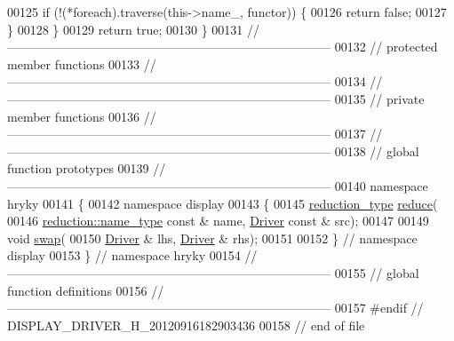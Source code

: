\begin{DoxyCode}
00125         \textcolor{keywordflow}{if} (!(*foreach).traverse(this->name\_, functor)) \{
00126             \textcolor{keywordflow}{return} \textcolor{keyword}{false};
00127         \}
00128     \}
00129     \textcolor{keywordflow}{return} \textcolor{keyword}{true};
00130 \}
00131 \textcolor{comment}{//
      ------------------------------------------------------------------------------}
00132 \textcolor{comment}{// protected member functions}
00133 \textcolor{comment}{//
      ------------------------------------------------------------------------------}
00134 \textcolor{comment}{//
      ------------------------------------------------------------------------------}
00135 \textcolor{comment}{// private member functions}
00136 \textcolor{comment}{//
      ------------------------------------------------------------------------------}
00137 \textcolor{comment}{//
      ------------------------------------------------------------------------------}
00138 \textcolor{comment}{// global function prototypes}
00139 \textcolor{comment}{//
      ------------------------------------------------------------------------------}
00140 \textcolor{keyword}{namespace }hryky
00141 \{
00142 \textcolor{keyword}{namespace }display
00143 \{
00145     \hyperlink{classhryky_1_1_intrusive_ptr}{reduction_type} \hyperlink{namespacehryky_1_1display_a705ac3a5de0998e1e0d3fa595044ec55}{reduce}(
00146         \hyperlink{classhryky_1_1reduction_1_1_string}{reduction::name_type} \textcolor{keyword}{const} & name, \hyperlink{classhryky_1_1display_1_1_driver}{Driver} \textcolor{keyword}{const} & src);
00147 
00149     \textcolor{keywordtype}{void} \hyperlink{namespacehryky_1_1display_ad28f0d5e406742090973e6c81321a00f}{swap}(
00150         \hyperlink{classhryky_1_1display_1_1_driver}{Driver} & lhs, \hyperlink{classhryky_1_1display_1_1_driver}{Driver} & rhs);
00151 
00152 \} \textcolor{comment}{// namespace display}
00153 \} \textcolor{comment}{// namespace hryky}
00154 \textcolor{comment}{//
      ------------------------------------------------------------------------------}
00155 \textcolor{comment}{// global function definitions}
00156 \textcolor{comment}{//
      ------------------------------------------------------------------------------}
00157 \textcolor{preprocessor}{#endif // DISPLAY\_DRIVER\_H\_20120916182903436}
00158 \textcolor{preprocessor}{}\textcolor{comment}{// end of file}
\end{DoxyCode}
